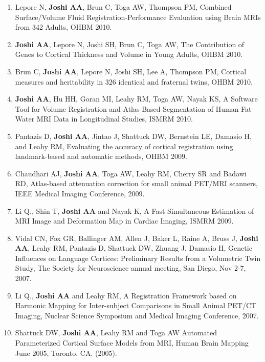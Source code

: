 \documentclass[overlapped,line,letterpaper]{res}
\begin{document}
\begin{resume}
\begin{enumerate}
    \item Lepore N, \textbf{Joshi AA}, Brun C, Toga AW, Thompson PM, Combined Surface/Volume Fluid Registration-Performance Evaluation using Brain MRIs from 342 Adults, OHBM 2010.

    \item \textbf{Joshi AA}, Lepore N, Joshi SH, Brun C, Toga AW, The Contribution of Genes to  Cortical Thickness and Volume in Young Adults, OHBM 2010.

    \item Brun C, \textbf{Joshi AA}, Lepore N, Joshi SH, Lee A, Thompson PM, Cortical measures and heritability in 326 identical and fraternal twins, OHBM 2010.

    \item \textbf{Joshi AA}, Hu HH, Goran MI, Leahy RM, Toga AW, Nayak KS, A Software Tool for Volume Registration and Atlas-Based Segmentation of Human Fat-Water MRI Data in Longitudinal Studies, ISMRM 2010.

    \item Pantazis D, \textbf{Joshi AA}, Jintao J, Shattuck DW, Bernstein LE, Damasio H, and Leahy RM, {Evaluating the accuracy of cortical registration using landmark-based and automatic methods}, OHBM 2009.

    \item Chaudhari AJ, \textbf{Joshi AA}, Toga AW, Leahy RM, Cherry SR and Badawi RD, {Atlas-based attenuation correction for small animal PET/MRI scanners}, IEEE Medical Imaging Conference, 2009.

    \item Li Q., Shin T, \textbf{Joshi AA} and Nayak K, {A Fast Simultaneous Estimation of MRI Image and Deformation Map in Cardiac Imaging}, ISMRM 2009. 

    \item Vidal CN, Fox GR, Ballinger AM, Allen J, Baker L, Raine A, Bruss J, \textbf{Joshi AA}, Leahy RM, Pantazis D, Shattuck DW, Zhuang J, Damasio H, {Genetic Influences on Language Cortices: Preliminary Results from a Volumetric Twin Study}, The Society for Neuroscience annual meeting, San Diego, Nov 2-7, 2007.

    \item Li Q., \textbf{Joshi AA} and Leahy RM, {A Registration Framework based on Harmonic Mapping for Inter-subject Comparisons in Small Animal {PET/CT} Imaging}, Nuclear Science Symposium and Medical Imaging Conference, 2007.

    \item Shattuck DW, \textbf{Joshi AA}, Leahy RM and Toga AW {Automated Parameterized Cortical Surface Models from MRI}, Human Brain Mapping June 2005, Toronto, CA. (2005).


\end{enumerate}
\end{resume}
\end{document}
